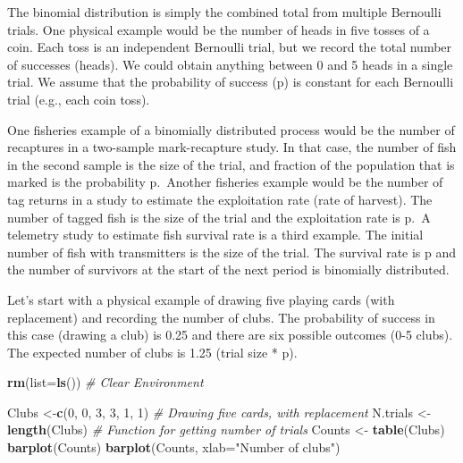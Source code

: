 \documentclass[
]{krantz}
\makeatletter
\newenvironment{Shaded}{\begin{snugshade}}{\end{snugshade}}
\newcommand{\AttributeTok}[1]{\textcolor[rgb]{0.27,0.27,0.27}{#1}}
\newcommand{\CommentTok}[1]{\textcolor[rgb]{0.37,0.37,0.37}{\textit{#1}}}
\newcommand{\DecValTok}[1]{\textcolor[rgb]{0.06,0.06,0.06}{#1}}
\newcommand{\FunctionTok}[1]{\textcolor[rgb]{0.27,0.27,0.27}{\textbf{#1}}}
\newcommand{\NormalTok}[1]{#1}
\newcommand{\OtherTok}[1]{\textcolor[rgb]{0.37,0.37,0.37}{#1}}
\newcommand{\StringTok}[1]{\textcolor[rgb]{0.5,0.5,0.5}{#1}}
\newenvironment{kframe}{%
\medskip{}
\setlength{\fboxsep}{.8em}
 \def\at@end@of@kframe{}%
 \ifinner\ifhmode%
  \def\at@end@of@kframe{\end{minipage}}%
  \begin{minipage}{\columnwidth}%
 \fi\fi%
 \def\FrameCommand##1{\hskip\@totalleftmargin \hskip-\fboxsep
 \colorbox{shadecolor}{##1}\hskip-\fboxsep
     \hskip-\linewidth \hskip-\@totalleftmargin \hskip\columnwidth}%
 \MakeFramed {\advance\hsize-\width
   \@totalleftmargin\z@ \linewidth\hsize
   \@setminipage}}%
 {\par\unskip\endMakeFramed%
 \at@end@of@kframe}
\renewenvironment{Shaded}{\begin{kframe}}{\end{kframe}}
\makeatother
\begin{document}
The binomial distribution is simply the combined total from multiple Bernoulli trials. One physical example would be the number of heads in five tosses of a coin. Each toss is an independent Bernoulli trial, but we record the total number of successes (heads). We could obtain anything between 0 and 5 heads in a single trial. We assume that the probability of success (p) is constant for each Bernoulli trial (e.g., each coin toss).

One fisheries example of a binomially distributed process would be the number of recaptures in a two-sample mark-recapture study. In that case, the number of fish in the second sample is the size of the trial, and fraction of the population that is marked is the probability p.~Another fisheries example would be the number of tag returns in a study to estimate the exploitation rate (rate of harvest). The number of tagged fish is the size of the trial and the exploitation rate is p.~A telemetry study to estimate fish survival rate is a third example. The initial number of fish with transmitters is the size of the trial. The survival rate is p and the number of survivors at the start of the next period is binomially distributed.

Let's start with a physical example of drawing five playing cards (with replacement) and recording the number of clubs. The probability of success in this case (drawing a club) is 0.25 and there are six possible outcomes (0-5 clubs). The expected number of clubs is 1.25 (trial size * p).

\begin{Shaded}
\begin{Highlighting}[]
\FunctionTok{rm}\NormalTok{(}\AttributeTok{list=}\FunctionTok{ls}\NormalTok{()) }\CommentTok{\# Clear Environment}

\NormalTok{Clubs }\OtherTok{\textless{}{-}}\FunctionTok{c}\NormalTok{(}\DecValTok{0}\NormalTok{, }\DecValTok{0}\NormalTok{, }\DecValTok{3}\NormalTok{, }\DecValTok{3}\NormalTok{, }\DecValTok{1}\NormalTok{, }\DecValTok{1}\NormalTok{)  }\CommentTok{\# Drawing five cards, with replacement}
\NormalTok{N.trials }\OtherTok{\textless{}{-}} \FunctionTok{length}\NormalTok{(Clubs) }\CommentTok{\# Function for getting number of trials}
\NormalTok{Counts }\OtherTok{\textless{}{-}} \FunctionTok{table}\NormalTok{(Clubs)}
\FunctionTok{barplot}\NormalTok{(Counts)}
\FunctionTok{barplot}\NormalTok{(Counts, }\AttributeTok{xlab=}\StringTok{"Number of clubs"}\NormalTok{)}
\end{Highlighting}
\end{Shaded}
\end{document}
